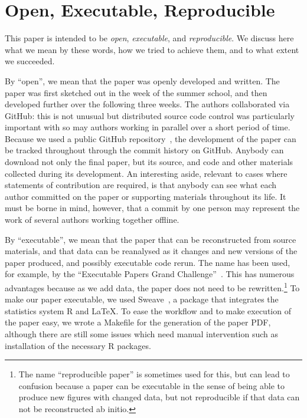 \section{Open, Executable, Reproducible}

This paper is intended to be \emph{open}, 
\emph{executable},
and \emph{reproducible}.  
We discuss here what we mean by these words, how we tried to achieve them, and to what extent we succeeded.

By ``open'', we mean that the paper was openly developed and written.  The paper was first sketched out in the week of the summer school, and then 
developed further over the following three weeks.  The authors collaborated via GitHub: this is not unusual but distributed source code control was  particularly important with so may authors working in parallel over a short period of time.
Because we used a public GitHub repository~\cite{summerschoolpaper}, 
the
development of the paper can be tracked throughout through the commit history on
GitHub.  
Anybody can download not only the final paper, but its source, and code and other materials collected during its development.  
An interesting aside, relevant to cases where statements of contribution are required, is that anybody can see what each author committed on the paper or supporting materials throughout its life.  It must be borne in mind, however, that a commit by one person may represent the work of several authors working together offline.  

By ``executable'', we mean that the paper that can be reconstructed from source 
materials, and that data can be reanalysed as it changes and new versions of the paper produced, and possibly executable code rerun.   The name has been used, for example, by the ``Executable Papers Grand Challenge''~\cite{executablepaper}.
This has numerous advantages because as we add data, the paper does not need to be rewritten.\footnote{The name ``reproducible paper'' is sometimes used for this, but can lead to confusion because a paper can be executable in the sense of being able to produce new figures with 
changed data, but not reproducible if that data can not be reconstructed ab initio.}
To make our paper executable, we used Sweave~\cite{lmucs-papers:Leisch:2002}, a package that integrates the statistics system R and \LaTeX. 
To ease the workflow and to make execution of the paper easy, we wrote a Makefile for the generation of the paper PDF, although there are still some issues which need manual intervention such as installation of the necessary R packages. 

